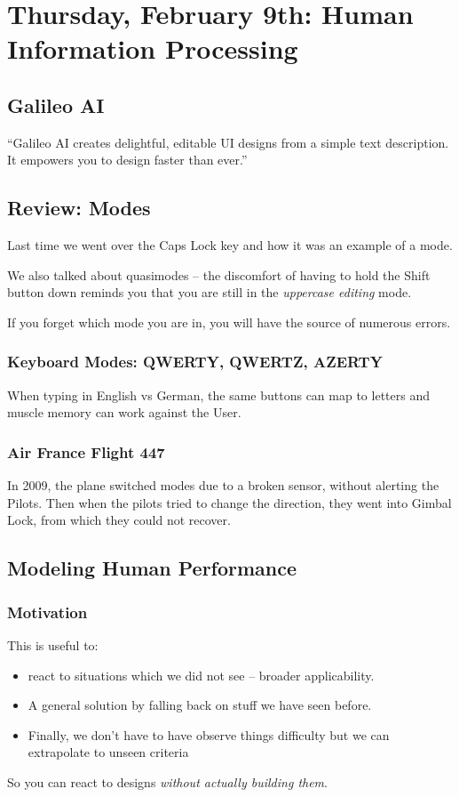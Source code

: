 \section{Thursday, February 9th: Human Information Processing}
\subsection{Galileo AI}
``Galileo AI creates delightful, editable UI designs from a simple text description. It empowers you to design faster than ever.''

\subsection{Review: Modes}
Last time we went over the Caps Lock key and how it was an example of a mode.

We also talked about quasimodes -- the discomfort of having to hold the Shift button down reminds you that you are still in the \textit{uppercase editing} mode.

\begin{important}
If you forget which mode you are in, you will have the source of numerous errors.
\end{important}

\subsubsection{Keyboard Modes: QWERTY, QWERTZ, AZERTY}
When typing in English vs German, the same buttons can map to letters and muscle memory can work against the User.

\subsubsection{Air France Flight 447}
In 2009, the plane switched modes due to a broken sensor, without alerting the Pilots. Then when the pilots tried to change the direction, they went into Gimbal Lock, from which they could not recover.

\subsection{Modeling Human Performance}
\subsubsection{Motivation}
This is useful to:
\begin{itemize}
    \item react to situations which we did not see -- broader applicability.
    \item A general solution by falling back on stuff we have seen before.
    \item Finally, we don't have to have observe things difficulty but we can extrapolate to unseen criteria
\end{itemize}
So you can react to designs \textit{without actually building them}.

